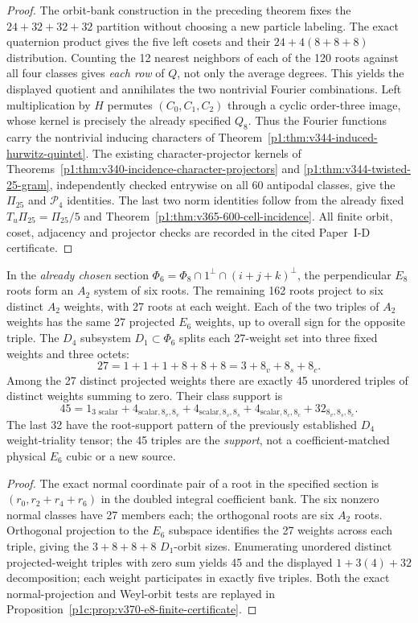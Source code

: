 \documentclass[11pt]{article}
\begin{document}
\begin{proof}
The orbit-bank construction in the preceding theorem fixes the
$24+32+32+32$ partition without choosing a new particle labeling.
The exact quaternion product gives the five left cosets and their
$24+4(8+8+8)$ distribution.  Counting the 12 nearest neighbors of
each of the 120 roots against all four classes gives \emph{each row} of
$Q$, not only the average degrees.  This yields the displayed quotient
and annihilates the two nontrivial Fourier combinations.
Left multiplication by $H$ permutes $(C_0,C_1,C_2)$ through a cyclic
order-three image, whose kernel is precisely the already specified $Q_8$.
Thus the Fourier functions carry the nontrivial inducing characters
of Theorem~\ref{p1:thm:v344-induced-hurwitz-quintet}.  The existing
character-projector kernels of
Theorems~\ref{p1:thm:v340-incidence-character-projectors} and
\ref{p1:thm:v344-twisted-25-gram}, independently checked entrywise on
all 60 antipodal classes, give the $\Pi_{25}$ and $\mathscr P_4$
identities.  The last two norm identities follow from the already fixed
$T_u\Pi_{25}=\Pi_{25}/5$ and
Theorem~\ref{p1:thm:v365-600-cell-incidence}.  All finite orbit,
coset, adjacency and projector checks are recorded in the cited
Paper~I-D certificate.
\end{proof}

\begin{proposition}
\label{p1:prop:v370-e6-cubic-support}
In the \emph{already chosen} section
$\Phi_6=\Phi_8\cap1^\perp\cap(i+j+k)^\perp$,
the perpendicular $E_8$ roots form an $A_2$ system of six roots.
The remaining 162 roots project to six distinct $A_2$ weights, with
27 roots at each weight.  Each of the two triples of $A_2$ weights
has the same 27 projected $E_6$ weights, up to overall sign for the
opposite triple.  The $D_4$ subsystem $D_1\subset\Phi_6$
splits each 27-weight set into three fixed weights and three octets:
\[
 27=1+1+1+8+8+8=3+8_v+8_s+8_c.
\]
Among the 27 distinct projected weights there are exactly 45 unordered
triples of distinct weights summing to zero.  Their class support is
\[
 \boxed{45=1_{3\text{ scalar}}+
 4_{\text{scalar},8_v,8_v}+
 4_{\text{scalar},8_s,8_s}+
 4_{\text{scalar},8_c,8_c}+
 32_{8_v,8_s,8_c}.}
\]
The last 32 have the root-support pattern of the previously established
$D_4$ weight-triality tensor; the 45 triples are the \emph{support},
not a coefficient-matched physical $E_6$ cubic or a new source.
\end{proposition}
\begin{proof}
The exact normal coordinate pair of a root in the specified section is
$(r_0,r_2+r_4+r_6)$ in the doubled integral coefficient bank.  The
six nonzero normal classes have 27 members each; the orthogonal roots
are six $A_2$ roots.  Orthogonal projection to the $E_6$ subspace
identifies the 27 weights across each triple, giving the
$3+8+8+8$ $D_1$-orbit sizes.  Enumerating unordered distinct
projected-weight triples with zero sum yields 45 and the displayed
$1+3(4)+32$ decomposition; each weight participates in exactly
five triples.  Both the exact normal-projection and Weyl-orbit tests
are replayed in Proposition~\ref{p1c:prop:v370-e8-finite-certificate}.
\end{proof}
\end{document}
